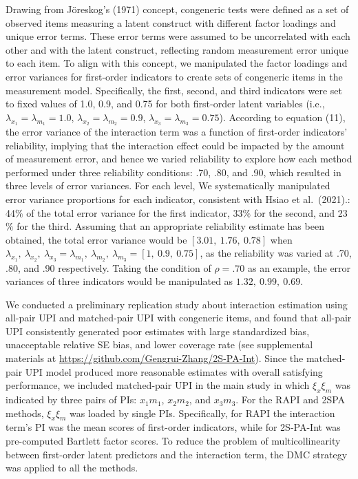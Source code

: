 \documentclass[
  man]{apa6}
\begin{document}
Drawing from Jöreskog's (1971) concept, congeneric tests were defined as a set of observed items measuring a latent construct with different factor loadings and unique error terms. These error terms were assumed to be uncorrelated with each other and with the latent construct, reflecting random measurement error unique to each item. To align with this concept, we manipulated the factor loadings and error variances for first-order indicators to create sets of congeneric items in the measurement model. Specifically, the first, second, and third indicators were set to fixed values of 1.0, 0.9, and 0.75 for both first-order latent variables (i.e., \(\lambda_{x_{1}} = \lambda_{m_{1}} = 1.0\), \(\lambda_{x_{2}} = \lambda_{m_{2}} = 0.9\), \(\lambda_{x_{3}} = \lambda_{m_{3}} = 0.75\)). According to equation (11), the error variance of the interaction term was a function of first-order indicators' reliability, implying that the interaction effect could be impacted by the amount of measurement error, and hence we varied reliability to explore how each method performed under three reliability conditions: .70, .80, and .90, which resulted in three levels of error variances. For each level, We systematically manipulated error variance proportions for each indicator, consistent with Hsiao et al.~(2021).: 44\(\%\) of the total error variance for the first indicator, 33\(\%\) for the second, and 23\(\%\) for the third. Assuming that an appropriate reliability estimate has been obtained, the total error variance would be \([3.01, \ 1.76, \ 0.78]\) when \(\lambda_{x_{1}}, \ \lambda_{x_{2}}, \ \lambda_{x_{3}} = \lambda_{m_{1}}, \ \lambda_{m_{2}}, \ \lambda_{m_{3}} = [1, \ 0.9, \ 0.75]\), as the reliability was varied at .70, .80, and .90 respectively. Taking the condition of \(\rho = .70\) as an example, the error variances of three indicators would be manipulated as \(1.32, \ 0.99, \ 0.69\).

We conducted a preliminary replication study about interaction estimation using all-pair UPI and matched-pair UPI with congeneric items, and found that all-pair UPI consistently generated poor estimates with large standardized bias, unacceptable relative SE bias, and lower coverage rate (see supplemental materials at \url{https://github.com/Gengrui-Zhang/2S-PA-Int}). Since the matched-pair UPI model produced more reasonable estimates with overall satisfying performance, we included matched-pair UPI in the main study in which \(\xi_{x}\xi_{m}\) was indicated by three pairs of PIs: \(x_{1}m_{1}\), \(x_{2}m_{2}\), and \(x_{3}m_{3}\). For the RAPI and 2SPA methods, \(\xi_{x}\xi_{m}\) was loaded by single PIs. Specifically, for RAPI the interaction term's PI was the mean scores of first-order indicators, while for 2S-PA-Int was pre-computed Bartlett factor scores. To reduce the problem of multicollinearity between first-order latent predictors and the interaction term, the DMC strategy was applied to all the methods.
\end{document}
